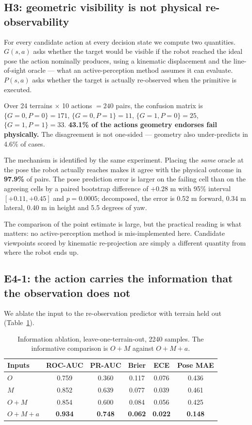 \documentclass[utf8]{FrontiersinHarvard}
\begin{document}
\subsection{H3: geometric visibility is not physical re-observability}

For every candidate action at every decision state we compute two quantities. $G(s,a)$
asks whether the target would be visible if the robot reached the ideal pose the action
nominally produces, using a kinematic displacement and the line-of-sight oracle ---
what an active-perception method assumes it can evaluate. $P(s,a)$ asks whether the
target is actually re-observed when the primitive is executed.

Over 24 terrains $\times$ 10 actions $= 240$ pairs, the confusion matrix is
$\{G{=}0,P{=}0\}=171$, $\{G{=}0,P{=}1\}=11$, $\{G{=}1,P{=}0\}=25$,
$\{G{=}1,P{=}1\}=33$. \textbf{43.1\% of the actions geometry endorses fail
physically.} The disagreement is not one-sided --- geometry also under-predicts in 4.6\%
of cases.

The mechanism is identified by the same experiment. Placing the \emph{same} oracle at
the pose the robot actually reaches makes it agree with the physical outcome in
\textbf{97.9\%} of pairs. The pose prediction error is larger on the failing cell than
on the agreeing cells by a paired bootstrap difference of $+0.28$ m with 95\% interval
$[+0.11, +0.45]$ and $p = 0.0005$; decomposed, the error is 0.52 m forward, 0.34 m
lateral, 0.40 m in height and 5.5 degrees of yaw.

The comparison of the point estimate is large, but the practical reading is what
matters: no active-perception method is mis-implemented here. Candidate viewpoints scored
by kinematic re-projection are simply a different quantity from where the robot ends up.

\subsection{E4-1: the action carries the information that the observation does not}

We ablate the input to the re-observation predictor with terrain held out
(Table~\ref{tab:ablation}).

\begin{table}[h]
\caption{Information ablation, leave-one-terrain-out, 2240 samples. The informative
comparison is $O{+}M$ against $O{+}M{+}a$.}
\label{tab:ablation}
\begin{tabular}{lccccc}
\toprule
Inputs & ROC-AUC & PR-AUC & Brier & ECE & Pose MAE \\
\midrule
$O$ & 0.759 & 0.360 & 0.117 & 0.076 & 0.436 \\
$M$ & 0.852 & 0.639 & 0.077 & 0.039 & 0.461 \\
$O{+}M$ & 0.854 & 0.600 & 0.084 & 0.056 & 0.425 \\
$O{+}M{+}a$ & \textbf{0.934} & \textbf{0.748} & \textbf{0.062} & \textbf{0.022} & \textbf{0.148} \\
\bottomrule
\end{tabular}
\end{table}
\end{document}
